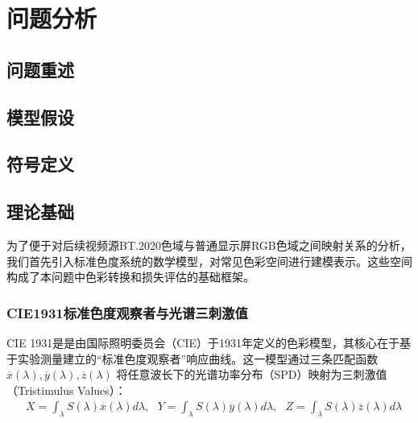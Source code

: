 \chapter[\hspace{0pt}问题分析]{{\heiti{}\hspace{0pt}问题分析}}

\removelofgap
\removelotgap

\section[\hspace{-2pt}问题重述]{{\heiti{} \hspace{-8pt}问题重述}}\label{section2: 问题重述}

\section[\hspace{-2pt}模型假设]{{\heiti{} \hspace{-8pt}模型假设}}\label{section2: 模型假设}


\section[\hspace{-2pt}符号定义]{{\heiti{} \hspace{-8pt}符号定义}}\label{section2: 符号定义}



\section[\hspace{-2pt}理论基础]{{\heiti{} \hspace{-8pt}理论基础}}\label{section2: 理论基础}


为了便于对后续视频源BT.2020色域与普通显示屏RGB色域之间映射关系的分析，我们首先引入标准色度系统的数学模型，对常见色彩空间进行建模表示。这些空间构成了本问题中色彩转换和损失评估的基础框架。

\subsection[\hspace{-2pt}CIE1931标准色度观察者与光谱三刺激值]{{\heiti{} \hspace{-8pt}CIE1931标准色度观察者与光谱三刺激值}}\label{section2: CIE1931标准色度观察者与光谱三刺激值}
CIE 1931是是由国际照明委员会（CIE）于1931年定义的色彩模型，其核心在于基于实验测量建立的“标准色度观察者”响应曲线。这一模型通过三条匹配函数 $\overline{x}(\lambda),\overline{y}(\lambda),\overline{z}(\lambda) $ 将任意波长下的光谱功率分布（SPD）映射为三刺激值（Tristimulus Values）：
\begin{equation}
\begin{aligned}
  &X = \int_{\lambda}S(\lambda)\overline{x}(\lambda)d\lambda,\ \ \ Y = \int_{\lambda}S(\lambda)\overline{y}(\lambda)d\lambda,\ \ \ Z = \int_{\lambda}S(\lambda)\overline{z}(\lambda)d\lambda
\end{aligned}
\end{equation}

